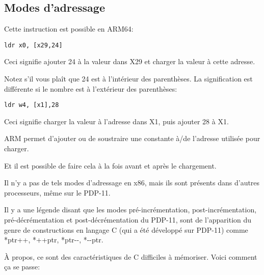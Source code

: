 ﻿\subsection{Modes d'adressage}
\label{ARM_postindex_vs_preindex}
\myindex{\CLanguageElements!\PostIncrement}
\myindex{\CLanguageElements!\PostDecrement}
\myindex{\CLanguageElements!\PreIncrement}
\myindex{\CLanguageElements!\PreDecrement}

Cette instruction est possible en ARM64:

\begin{lstlisting}[style=customasmARM]
ldr	x0, [x29,24]
\end{lstlisting}

Ceci signifie ajouter 24 à la valeur dans X29 et charger la valeur à cette adresse.

Notez s'il vous plaît que 24 est à l'intérieur des parenthèses.
La signification est différente si le nombre est à l'extérieur des parenthèses:

\begin{lstlisting}[style=customasmARM]
ldr	w4, [x1],28
\end{lstlisting}

Ceci signifie charger la valeur à l'adresse dans X1, puis ajouter 28 à X1.


ARM permet d'ajouter ou de soustraire une constante à/de l'adresse utilisée pour charger.

Et il est possible de faire cela à la fois avant et après le chargement.

Il n'y a pas de tels modes d'adressage en x86, mais ils sont présents dans d'autres
processeurs, même sur le PDP-11.

Il y a une légende disant que les modes pré-incrémentation, post-incrémentation,
pré-décrémentation et post-décrémentation du PDP-11, sont  de l'apparition
du genre de constructions en langage C (qui a été développé sur PDP-11) comme
*ptr++, *++ptr, *ptr-{}-, *-{}-ptr. 

À propos, ce sont des caractéristiques de C difficiles à mémoriser.
Voici comment ça se passe:

